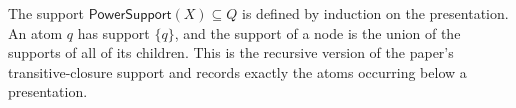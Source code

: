 \begin{definition}
The support $\mathsf{PowerSupport}(X)\subseteq Q$ is defined by induction
on the presentation.  An atom $q$ has support $\{q\}$, and the support of
a node is the union of the supports of all of its children.  This is the
recursive version of the paper's transitive-closure support and records
exactly the atoms occurring below a presentation.
\end{definition}
